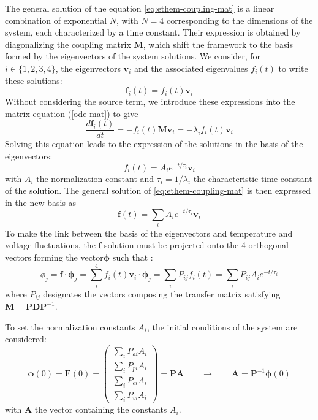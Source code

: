 The general solution of the equation \ref{eq:ethem-coupling-mat} is a linear combination of exponential $N$, with $N=4$ corresponding to the dimensions of the system, each characterized by a time constant. Their expression is obtained by diagonalizing the coupling matrix $\bm{M}$, which shift the framework to the basis formed by the eigenvectors of the system solutions. We consider, for $i \in \{1,2,3,4\}$, the eigenvectors $\bm{v}_i$ and the associated eigenvalues $f_i(t)$ to write these solutions:
\begin{equation}
\label{eq:eigen-solution}
\bm{f}_i(t) = f_i(t) \bm{v}_i
\end{equation}
Without considering the source term, we introduce these expressions into the matrix equation (\ref{ode-mat}) to give
\begin{equation}
\label{eq:eigen-solution-ode}
\frac{d \bm{f}_i(t)}{d t} = -f_i(t) \bm{M} \bm{v}_i = -\lambda_i f_i(t) \bm{v}_i
\end{equation}
Solving this equation leads to the expression of the solutions in the basis of the eigenvectors:
\begin{equation}
f_i(t) = A_i e^{-t/\tau_i} \bm{v}_i
\end{equation}
with $A_i$ the normalization constant and $\tau_i=1/\lambda_i$ the characteristic time constant of the solution. The general solution of \ref{eq:ethem-coupling-mat} is then expressed in the new basis as
\begin{equation}
\label{eq:eigein-solution-expr}
\bm{f}(t) = \sum_i A_i e^{-t/\tau_i} \bm{v}_i
\end{equation}
To make the link between the basis of the eigenvectors and temperature and voltage fluctuations, the $\bm{f}$ solution must be projected onto the 4 orthogonal vectors forming the vector$\bm{\phi}$ such that :
\begin{equation}
\label{eq:gen-solution}
\phi_j = \bm{f} \cdot \bm{\phi}_j = \sum_i^4 f_i(t) \bm{v}_i \cdot \bm{\phi}_j = \sum_i P_{ij} f_i(t) = \sum_i P_{ij} A_i e^{-t/\tau_i}
\end{equation}
where $P_{ij}$ designates the vectors composing the transfer matrix satisfying $\bm{M}=\bm{P} \bm{D} \bm{P}^{-1}$.

To set the normalization constants $A_i$, the initial conditions of the system are considered:
\begin{equation}
\bm{\phi}(0) = \bm{F}(0) =
\left( \begin{array}{c}
\sum_i P_{ai} A_i\\
\sum_i P_{pi} A_i\\
\sum_i P_{ei} A_i\\
\sum_i P_{vi} A_i
\end{array} \right) = \bm{P} \bm{A}
\qquad \longrightarrow \qquad \bm{A}=\bm{P}^{-1} \bm{\phi} (0)
\label{normal}
\end{equation}
with $\bm{A}$ the vector containing the constants $A_i$.

